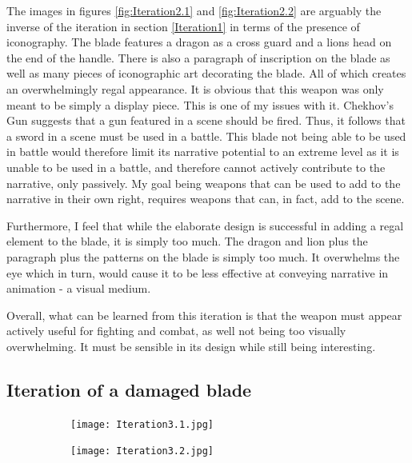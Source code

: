 \documentclass{article}
\begin{document}
The images in figures \ref{fig:Iteration2.1} and \ref{fig:Iteration2.2} are arguably the inverse of the iteration in section \ref{Iteration1} in terms of the presence of iconography. The blade features a dragon as a cross guard and a lions head on the end of the handle. There is also a paragraph of inscription on the blade as well as many pieces of iconographic art decorating the blade. All of which creates an overwhelmingly regal appearance. It is obvious that this weapon was only meant to be simply a display piece. This is one of my issues with it. Chekhov's Gun \parencite{delaney1990chekhov} suggests that a gun featured in a scene should be fired. Thus, it follows that a sword in a scene must be used in a battle. This blade not being able to be used in battle would therefore limit its narrative potential to an extreme level as it is unable to be used in a battle, and therefore cannot actively contribute to the narrative, only passively. My goal being weapons that can be used to add to the narrative in their own right, requires weapons that can, in fact, add to the scene.

Furthermore, I feel that while the elaborate design is successful in adding a regal element to the blade, it is simply too much. The dragon and lion plus the paragraph plus the patterns on the blade is simply too much. It overwhelms the eye which in turn, would cause it to be less effective at conveying narrative in animation - a visual medium.

Overall, what can be learned from this iteration is that the weapon must appear actively useful for fighting and combat, as well not being too visually overwhelming. It must be sensible in its design while still being interesting.

\pagebreak

\subsection{Iteration of a damaged blade} \label{Iteration3}

\begin{figure}[h]
    \centering
    \caption{}
    \label{fig:Iteration3}
    \begin{subfigure}{0.49\textwidth}
        \texttt{[image: Iteration3.1.jpg]}
        \caption{}
        \label{fig:Iteration3.1}
    \end{subfigure}
    \begin{subfigure}{0.49\textwidth}
        \texttt{[image: Iteration3.2.jpg]}
        \caption{}
        \label{fig:Iteration3.2}
    \end{subfigure}
\end{figure}
\end{document}
